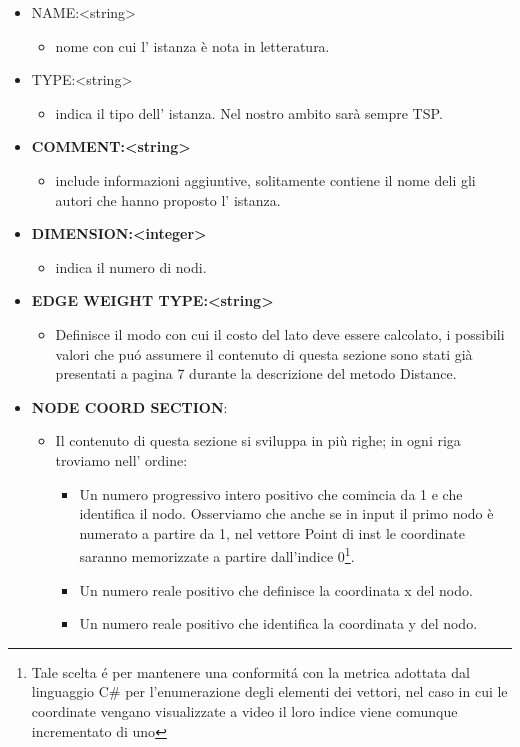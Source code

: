 \documentclass[11pt]{article}
\begin{document}
\begin{itemize}
	\item NAME:<string> 
	\begin{itemize}
	\item nome con cui l' istanza \`e nota in letteratura.
	\end{itemize}
	\item TYPE:<string>
	
	\begin{itemize}	 
	\item indica il tipo dell' istanza. Nel nostro ambito sar\`a sempre TSP.    
    \end{itemize}	
	 
	\item \textbf{COMMENT:<string>} 
	\begin{itemize}	
	\item include informazioni aggiuntive, solitamente contiene il nome deli gli autori che hanno proposto l'  				istanza.
	\end{itemize}	
	
		
	\item \textbf{DIMENSION:<integer>} 
	\begin{itemize}
	\item indica il numero di nodi.
	\end{itemize}	
	
	\item \textbf{EDGE WEIGHT TYPE:<string>}
	\begin{itemize} 
	\item Definisce il modo con cui il costo del lato deve essere calcolato, i possibili valori  che pu\'o assumere    		     il contenuto di questa sezione sono stati gi\`a presentati a pagina 7 durante la descrizione del metodo Distance.
	\end{itemize}	
	
	\item \textbf{NODE COORD SECTION}: 
	\begin{itemize}	
	
	\item Il contenuto di questa sezione si sviluppa in pi\`u righe; in ogni riga troviamo nell' ordine:
	\begin{itemize}
	\item Un numero progressivo intero positivo che comincia da 1 e che identifica il nodo. Osserviamo che anche se in input il primo nodo \`e numerato a partire da 1, nel vettore Point di inst le coordinate saranno memorizzate a partire dall'indice 0\footnote{Tale scelta \'e per mantenere una conformit\'a con la metrica adottata dal linguaggio C\# per l'enumerazione degli elementi dei vettori, nel caso in cui le coordinate vengano visualizzate a video il loro indice viene comunque incrementato di uno}.
	\item Un numero reale positivo che definisce la coordinata x del nodo.
	\item Un numero reale positivo che identifica la coordinata y del nodo.
	\end{itemize}		
	\end{itemize}	
\end{itemize}
\end{document}
